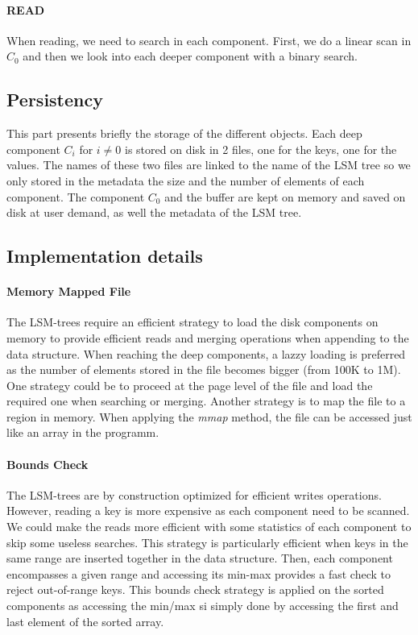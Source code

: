 \documentclass{sig-alternate-05-2015}
\begin{document}
\paragraph{READ}

When reading, we need to search in each component. First, we do a linear scan in $C_0$ and then we look into each deeper component with a binary search.

\subsection{Persistency}

This part presents briefly the storage of the different objects. Each deep component $C_i$ for $i \neq 0$ is stored on disk in 2 files, one for the keys, one for the values. The names of these two files are linked to the name of the LSM tree so we only stored in the metadata the size and the number of elements of each component. The component $C_0$ and the buffer are kept on memory and saved on disk at user demand, as well the metadata of the LSM tree.


\subsection{Implementation details}
\paragraph{Memory Mapped File}

The LSM-trees require an efficient strategy to load the disk components on memory to provide efficient reads and merging operations when appending to the data structure. When reaching the deep components, a lazzy loading is preferred as the number of elements stored in the file becomes bigger (from 100K to 1M). One strategy could be to proceed at the page level of the file and load the required one when searching or merging. Another strategy is to map the file to a region in memory. When applying the \textit{mmap} method, the file can be accessed just like an array in the programm.

\paragraph{Bounds Check}

The LSM-trees are by construction optimized for efficient writes operations. However, reading a key is more expensive as each component need to be scanned. We could make the reads more efficient with some statistics of each component to skip some useless searches. This strategy is particularly efficient when keys in the same range are inserted together in the data structure. Then, each component encompasses a given range and accessing its min-max provides a fast check to reject out-of-range keys. This bounds check strategy is applied on the sorted components as accessing the min/max si simply done by accessing the first and last element of the sorted array.
\end{document}
